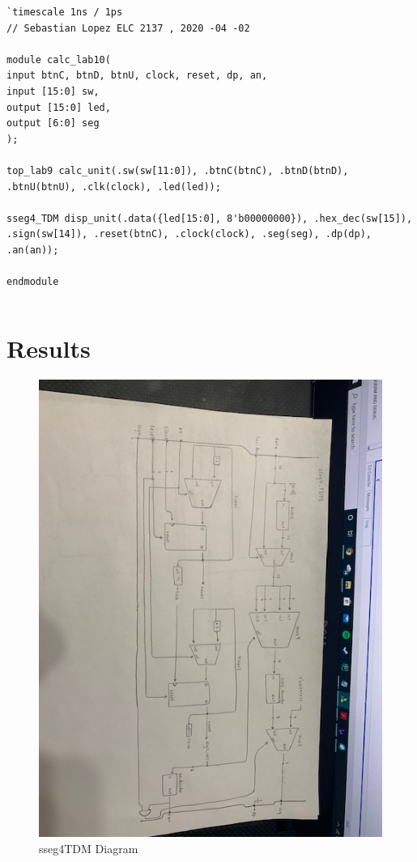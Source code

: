 \documentclass[11pt]{article}
\begin{document}
\begin{lstlisting}[style=Verilog,
caption=Calculator Code,
label=code:ex 
]
`timescale 1ns / 1ps
// Sebastian Lopez ELC 2137 , 2020 -04 -02

module calc_lab10(
input btnC, btnD, btnU, clock, reset, dp, an, 
input [15:0] sw, 
output [15:0] led, 
output [6:0] seg
);

top_lab9 calc_unit(.sw(sw[11:0]), .btnC(btnC), .btnD(btnD), .btnU(btnU), .clk(clock), .led(led));

sseg4_TDM disp_unit(.data({led[15:0], 8'b00000000}), .hex_dec(sw[15]), 
.sign(sw[14]), .reset(btnC), .clock(clock), .seg(seg), .dp(dp), .an(an)); 

endmodule
\end{lstlisting}

\begin{lstlisting}[style=Verilog,
caption=Counter test Code,
label=code:ex 
]

\end{lstlisting}

\section*{Results}

\begin{figure}[ht]\centering
	
	\includegraphics[width=1\textwidth,angle=0,origin=c]{sseg4_TDM}
	\caption{sseg4TDM Diagram}
	\label{fig:sim_with_table}
	
\end{figure}
\end{document}
